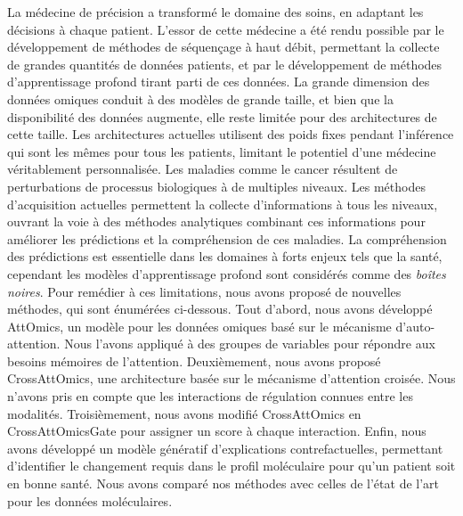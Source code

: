 La médecine de précision a transformé le domaine des soins, en adaptant les décisions à chaque patient.
L'essor de cette médecine a été rendu possible par le développement de méthodes de séquençage à haut débit, permettant la collecte de grandes quantités de données patients, et par le développement de méthodes d'apprentissage profond tirant parti de ces données.
La grande dimension des données omiques conduit à des modèles de grande taille, et bien que la disponibilité des données augmente, elle reste limitée pour des architectures de cette taille.
Les architectures actuelles utilisent des poids fixes pendant l'inférence qui sont les mêmes pour tous les patients, limitant le potentiel d'une médecine véritablement personnalisée.
Les maladies comme le cancer résultent de perturbations de processus biologiques à de multiples niveaux.
Les méthodes d'acquisition actuelles permettent la collecte d'informations à tous les niveaux, ouvrant la voie à des méthodes analytiques combinant ces informations pour améliorer les prédictions et la compréhension de ces maladies.
La compréhension des prédictions est essentielle dans les domaines à forts enjeux tels que la santé, cependant les modèles d'apprentissage profond sont considérés comme des \textit{boîtes noires}.
Pour remédier à ces limitations, nous avons proposé de nouvelles méthodes, qui sont énumérées ci-dessous.
Tout d'abord, nous avons développé AttOmics, un modèle pour les données omiques basé sur le mécanisme d'auto-attention.
Nous l'avons appliqué à des groupes de variables pour répondre aux besoins mémoires de l'attention.
Deuxièmement, nous avons proposé CrossAttOmics, une architecture basée sur le mécanisme d'attention croisée.
Nous n'avons pris en compte que les interactions de régulation connues entre les modalités.
Troisièmement, nous avons modifié CrossAttOmics en CrossAttOmicsGate pour assigner un score à chaque interaction.
Enfin, nous avons développé un modèle génératif d'explications contrefactuelles, permettant d'identifier le changement requis dans le profil moléculaire pour qu'un patient soit en bonne santé.
Nous avons comparé nos méthodes avec celles de l'état de l'art pour les données moléculaires.